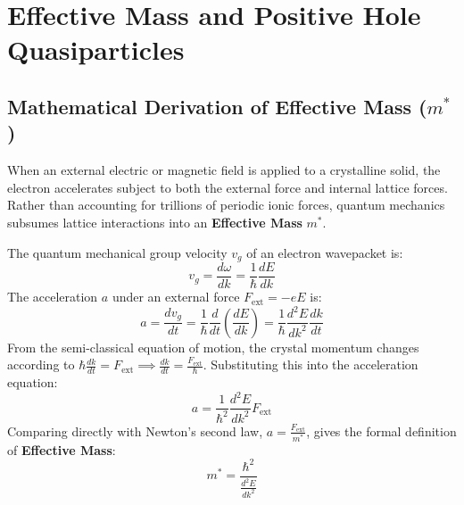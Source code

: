 \section{Effective Mass and Positive Hole Quasiparticles}
\subsection{Mathematical Derivation of Effective Mass ($m^*$)}
When an external electric or magnetic field is applied to a crystalline solid, the electron accelerates subject to both the external force and internal lattice forces. Rather than accounting for trillions of periodic ionic forces, quantum mechanics subsumes lattice interactions into an \textbf{Effective Mass} $m^*$.

\begin{derivationbox}
The quantum mechanical group velocity $v_g$ of an electron wavepacket is:
\begin{equation}
    v_g = \frac{d\omega}{dk} = \frac{1}{\hbar} \frac{dE}{dk}
\end{equation}
The acceleration $a$ under an external force $F_{\text{ext}} = -eE$ is:
\begin{equation}
    a = \frac{dv_g}{dt} = \frac{1}{\hbar}\frac{d}{dt}\left(\frac{dE}{dk}\right) = \frac{1}{\hbar}\frac{d^2E}{dk^2}\frac{dk}{dt}
\end{equation}
From the semi-classical equation of motion, the crystal momentum changes according to $\hbar \frac{dk}{dt} = F_{\text{ext}} \implies \frac{dk}{dt} = \frac{F_{\text{ext}}}{\hbar}$. Substituting this into the acceleration equation:
\begin{equation}
    a = \frac{1}{\hbar^2}\frac{d^2E}{dk^2} F_{\text{ext}}
\end{equation}
Comparing directly with Newton's second law, $a = \frac{F_{\text{ext}}}{m^*}$, gives the formal definition of \textbf{Effective Mass}:
\begin{equation}
    m^* = \frac{\hbar^2}{\frac{d^2E}{dk^2}}
\end{equation}
\end{derivationbox}

